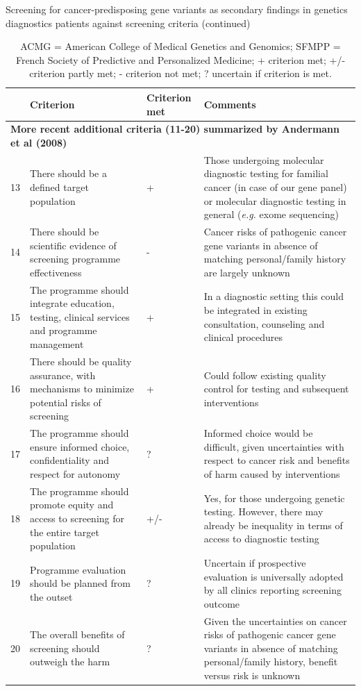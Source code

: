 \begin{table}
	\footnotesize
	\caption*{\label{table:summary}Screening for cancer-predisposing gene variants as secondary findings in genetics diagnostics patients against screening criteria (continued)}
	\begin{tabular}{ p{0.5cm} p{5.5cm} p{2cm} p{7cm} }
		& \footnotesize{\textbf{Criterion}} & \footnotesize{\textbf{Criterion met}} & \footnotesize{\textbf{Comments}} \\
		\hline 
		\multicolumn{4}{l}{\textbf{More recent additional criteria (11-20) summarized by Andermann et al (2008) \cite{Andermann_2008}}} \\
		\hline 
		
		13 & There should be a defined target population & + & Those undergoing molecular diagnostic testing for familial cancer (in case of our gene panel) or molecular diagnostic testing in general (\textsl{e.g.} exome sequencing) \\
		14 & There should be scientific evidence of screening programme effectiveness & -  & Cancer risks of pathogenic cancer gene variants in absence of matching personal/family history are largely unknown \\
		15 & The programme should integrate education, testing, clinical services and programme management & + & In a diagnostic setting this could be integrated in existing consultation, counseling and clinical procedures \\
		16 & There should be quality assurance, with mechanisms to minimize potential risks of screening & + & Could follow existing quality control for testing and subsequent interventions \\
		17 & The programme should ensure informed choice, confidentiality and respect for autonomy & ? & Informed choice would be difficult, given uncertainties with respect to cancer risk and benefits of harm caused by interventions \\
		18 & The programme should promote equity and access to screening for the entire target population & +/- & Yes, for those undergoing genetic testing. However, there may already be inequality in terms of access to diagnostic testing \\
		19 & Programme evaluation should be planned from the outset & ? & Uncertain if prospective evaluation is universally adopted by all clinics reporting screening outcome \\
		20 & The overall benefits of screening should outweigh the harm & ? & Given the uncertainties on cancer risks of pathogenic cancer gene variants in absence of matching personal/family history, benefit versus risk is unknown \\
		\hline
	\end{tabular}
	\caption*{ACMG = American College of Medical Genetics and Genomics; SFMPP = French Society of Predictive and Personalized Medicine; + criterion met; +/- criterion partly met; - criterion not met; ? uncertain if criterion is met.}
\end{table}


